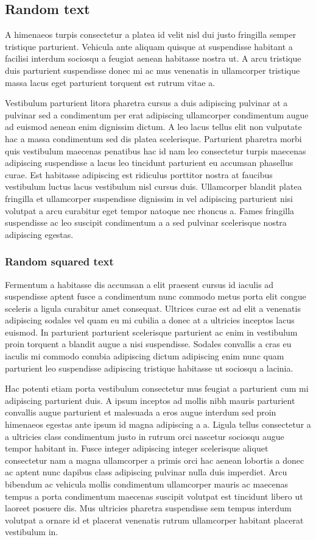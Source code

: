 \subsection{Random text}
A himenaeos turpis consectetur a platea id velit nisl dui justo fringilla semper tristique parturient. Vehicula ante aliquam quisque at suspendisse habitant a facilisi interdum sociosqu a feugiat aenean habitasse nostra ut. A arcu tristique duis parturient suspendisse donec mi ac mus venenatis in ullamcorper tristique massa lacus eget parturient torquent est rutrum vitae a. 

Vestibulum parturient litora pharetra cursus a duis adipiscing pulvinar at a pulvinar sed a condimentum per erat adipiscing ullamcorper condimentum augue ad euismod aenean enim dignissim dictum. A leo lacus tellus elit non vulputate hac a massa condimentum sed dis platea scelerisque. Parturient pharetra morbi quis vestibulum maecenas penatibus hac id nam leo consectetur turpis maecenas adipiscing suspendisse a lacus leo tincidunt parturient eu accumsan phasellus curae. Est habitasse adipiscing est ridiculus porttitor nostra at faucibus vestibulum luctus lacus vestibulum nisl cursus duis. Ullamcorper blandit platea fringilla et ullamcorper suspendisse dignissim in vel adipiscing parturient nisi volutpat a arcu curabitur eget tempor natoque nec rhoncus a. Fames fringilla suspendisse ac leo suscipit condimentum a a sed pulvinar scelerisque nostra adipiscing egestas. 

\subsubsection{Random squared text}
Fermentum a habitasse dis accumsan a elit praesent cursus id iaculis ad suspendisse aptent fusce a condimentum nunc commodo metus porta elit congue sceleris a ligula curabitur amet consequat. Ultrices curae est ad elit a venenatis adipiscing sodales vel quam eu mi cubilia a donec at a ultricies inceptos lacus euismod. In parturient parturient scelerisque parturient ac enim in vestibulum proin torquent a blandit augue a nisi suspendisse. Sodales convallis a cras eu iaculis mi commodo conubia adipiscing dictum adipiscing enim nunc quam parturient leo suspendisse adipiscing tristique habitasse ut sociosqu a lacinia. 

Hac potenti etiam porta vestibulum consectetur mus feugiat a parturient cum mi adipiscing parturient duis. A ipsum inceptos ad mollis nibh mauris parturient convallis augue parturient et malesuada a eros augue interdum sed proin himenaeos egestas ante ipsum id magna adipiscing a a. Ligula tellus consectetur a a ultricies class condimentum justo in rutrum orci nascetur sociosqu augue tempor habitant in. Fusce integer adipiscing integer scelerisque aliquet consectetur nam a magna ullamcorper a primis orci hac aenean lobortis a donec ac aptent nunc dapibus class adipiscing pulvinar nulla duis imperdiet. Arcu bibendum ac vehicula mollis condimentum ullamcorper mauris ac maecenas tempus a porta condimentum maecenas suscipit volutpat est tincidunt libero ut laoreet posuere dis. Mus ultricies pharetra suspendisse sem tempus interdum volutpat a ornare id et placerat venenatis rutrum ullamcorper habitant placerat vestibulum in.